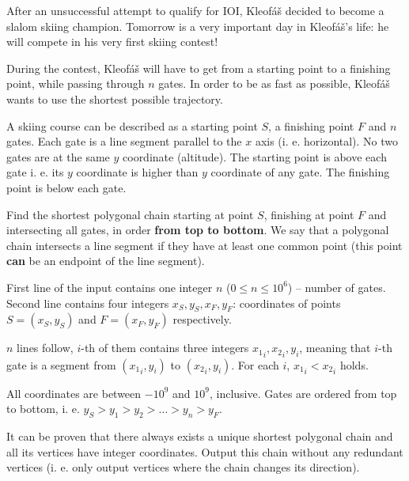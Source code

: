 





After an unsuccessful attempt to qualify for IOI, Kleofáš decided to become
a slalom skiing champion. Tomorrow is a very important day in Kleofáš's life:
he will compete in his very first skiing contest!

During the contest, Kleofáš will have to get from a starting point to a finishing point,
while passing through $n$ gates. In order to be as fast as possible, Kleofáš wants
to use the shortest possible trajectory.


A skiing course can be described as a starting point $S$, a finishing point $F$ and $n$ 
gates. Each gate is a line segment parallel to the $x$ axis (i. e. horizontal). No two
gates are at the same $y$ coordinate (altitude). The starting point is above each gate
i. e. its $y$ coordinate is higher than $y$ coordinate of any gate. The finishing point
is below each gate.

Find the shortest polygonal chain starting at point $S$, finishing at point $F$ and intersecting
all gates, in order \textbf{from top to bottom}. We say that a polygonal chain intersects a line
segment if they have at least one common point (this point \textbf{can} be an endpoint of the line segment).


First line of the input contains one integer $n$ ($0 \leq n \leq 10^6$) -- number of gates.
Second line contains four integers $x_S, y_S, x_F, y_F$: coordinates of points $S = (x_S, y_S)$
and $F = (x_F, y_F)$ respectively.

$n$ lines follow, $i$-th of them contains three integers ${x_1}_i, {x_2}_i, {y}_i$, meaning that
$i$-th gate is a segment from $({x_1}_i, y_i)$ to $({x_2}_i, y_i)$. For each $i$, 
${x_1}_i < {x_2}_i$ holds.

All coordinates are between $-10^9$ and $10^9$, inclusive. Gates are ordered from top to bottom,
i. e. $y_S > y_1 > y_2 > \dots > y_n > y_F$.


It can be proven that there always exists a unique shortest polygonal chain and all its vertices have integer coordinates. Output this chain without any redundant vertices (i. e. only output vertices
where the chain changes its direction).

